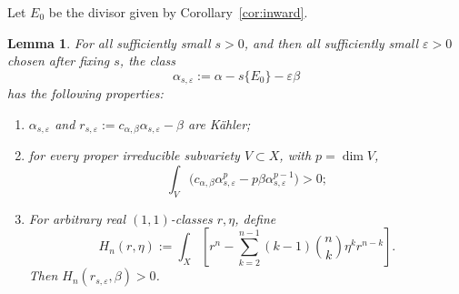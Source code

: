 \documentclass[reqno]{amsart}
\newcommand{\cab}{c_{\alpha,\beta}}
\theoremstyle{plain}
\newtheorem{lemma}[thm]{Lemma}
\theoremstyle{remark}
\begin{document}
Let $E_0$ be the divisor given by Corollary~\ref{cor:inward}.
\begin{lemma}
    \label{lem:wall-perturb}
For all sufficiently small $s>0$, and then all sufficiently small
$\varepsilon>0$ chosen after fixing $s$, the class
\begin{equation}\label{eq:residual-class}
 \alpha_{s,\varepsilon}
 :=\alpha-s\{E_0\}-\varepsilon\beta
\end{equation}
has the following properties:
\begin{enumerate}[label=\textup{(\roman*)}]
\item $\alpha_{s,\varepsilon}$ and
      $r_{s,\varepsilon}:=\cab\alpha_{s,\varepsilon}-\beta$
      are K\"ahler;
\item for every proper irreducible subvariety $V\subset X$, with
      $p=\dim V$,
      \begin{equation}\label{eq:strict-residual}
       \int_V\bigl(\cab\alpha_{s,\varepsilon}^p
       -p\beta\alpha_{s,\varepsilon}^{p-1}\bigr)>0;
      \end{equation}
\item For arbitrary real $(1,1)$-classes $r,\eta$, define
      \begin{equation}\label{eq:top-H}
       H_n(r,\eta):=
       \int_X\left[
       r^n
       -\sum_{k=2}^{n-1}(k-1)\binom nk
       \eta^kr^{n-k}\right].
      \end{equation}
      Then $H_n(r_{s,\varepsilon},\beta)>0$.
\end{enumerate}
\end{lemma}
\end{document}
